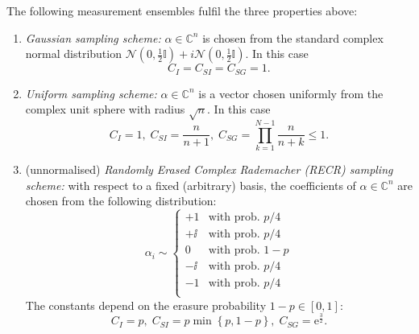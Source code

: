 \begin{proposition}%
  \label{prop:gauss+recr_requirements}
  The following measurement ensembles fulfil the three properties above:
  \begin{enumerate}

    \item \emph{Gaussian sampling scheme:} $\alpha \in \mathbb{C}^n$ is chosen from the standard complex normal distribution $\mathcal{N}(0,\tfrac{1}{2}\mathbb{I})+ i \mathcal{N}(0,\tfrac{1}{2}\mathbb{I})$. In this case
  \begin{equation*}
    C_I = C_{SI} = C_{SG} = 1.
  \end{equation*}

  \item \emph{Uniform sampling scheme:} $\alpha \in \mathbb{C}^n$ is a vector chosen uniformly from the complex unit sphere with radius $\sqrt{n}$. In this case
  \begin{equation*}
    C_I = 1, \; C_{SI} = \frac{n}{n+1}, \; C_{SG} = \prod_{k=1}^{N-1} \frac{n}{n+k} \leq 1.
  \end{equation*}

  \item (unnormalised) \emph{Randomly Erased Complex Rademacher (RECR) sampling scheme:} with respect to a fixed (arbitrary) basis, the coefficients of $\alpha \in \mathbb{C}^n$ are chosen from the following distribution:
  \begin{equation}
  \alpha_i \sim
  \begin{cases}
  +1 & \textrm{with prob. } p/4 \\
  +\ii & \textrm{with prob. } p/4 \\
  0 & \textrm{with prob. } 1-p \\
  -\ii & \textrm{with prob. } p/4 \\
  -1 & \textrm{with prob. } p/4 \\
  \end{cases}
  \label{eq:definition_recr}
  \end{equation}
  The constants depend on the erasure probability $1-p \in [0,1]$:
  \begin{equation*}
  C_I = p,\; C_{SI} = p \min \left\{p,1-p \right\}, \; C_{SG} = \mathrm{e}^{\frac{3}{2}}.
  \end{equation*}
  \end{enumerate}
\end{proposition}



